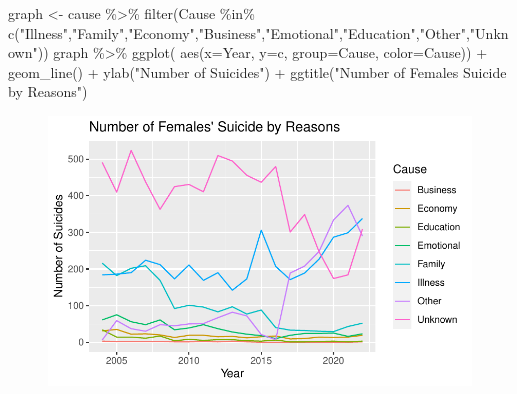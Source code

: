 \documentclass[
  11pt,
  a4paper,
  DIV=11,
  numbers=noendperiod]{scrartcl}
\newenvironment{Shaded}{\begin{snugshade}}{\end{snugshade}}
\newcommand{\AttributeTok}[1]{\textcolor[rgb]{0.40,0.45,0.13}{#1}}
\newcommand{\DecValTok}[1]{\textcolor[rgb]{0.68,0.00,0.00}{#1}}
\newcommand{\FunctionTok}[1]{\textcolor[rgb]{0.28,0.35,0.67}{#1}}
\newcommand{\NormalTok}[1]{\textcolor[rgb]{0.00,0.23,0.31}{#1}}
\newcommand{\OtherTok}[1]{\textcolor[rgb]{0.00,0.23,0.31}{#1}}
\newcommand{\SpecialCharTok}[1]{\textcolor[rgb]{0.37,0.37,0.37}{#1}}
\newcommand{\StringTok}[1]{\textcolor[rgb]{0.13,0.47,0.30}{#1}}
\begin{document}
\begin{Shaded}
\end{Shaded}

\begin{Shaded}
\begin{Highlighting}[]
\NormalTok{graph }\OtherTok{\textless{}{-}}\NormalTok{ cause }\SpecialCharTok{\%\textgreater{}\%} 
    \FunctionTok{filter}\NormalTok{(Cause }\SpecialCharTok{\%in\%} \FunctionTok{c}\NormalTok{(}\StringTok{"Illness"}\NormalTok{,}\StringTok{"Family"}\NormalTok{,}\StringTok{"Economy"}\NormalTok{,}\StringTok{"Business"}\NormalTok{,}\StringTok{"Emotional"}\NormalTok{,}\StringTok{"Education"}\NormalTok{,}\StringTok{"Other"}\NormalTok{,}\StringTok{"Unknown"}\NormalTok{))}
\NormalTok{  graph }\SpecialCharTok{\%\textgreater{}\%}
    \FunctionTok{ggplot}\NormalTok{( }\FunctionTok{aes}\NormalTok{(}\AttributeTok{x=}\NormalTok{Year, }\AttributeTok{y=}\NormalTok{c, }\AttributeTok{group=}\NormalTok{Cause, }\AttributeTok{color=}\NormalTok{Cause)) }\SpecialCharTok{+}
      \FunctionTok{geom\_line}\NormalTok{() }\SpecialCharTok{+}
      \FunctionTok{ylab}\NormalTok{(}\StringTok{"Number of Suicides"}\NormalTok{) }\SpecialCharTok{+}
      \FunctionTok{ggtitle}\NormalTok{(}\StringTok{"Number of Females\textquotesingle{} Suicide by Reasons"}\NormalTok{)}
\end{Highlighting}
\end{Shaded}

\begin{figure}[H]

{\centering \includegraphics{analysis_files/figure-pdf/unnamed-chunk-19-1.pdf}

}

\end{figure}
\end{document}
